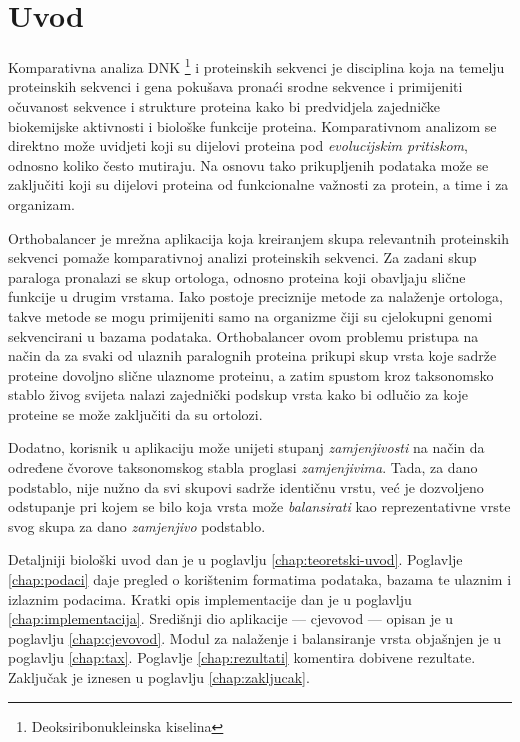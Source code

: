 \chapter{Uvod}
\label{chap:uvod}

Komparativna analiza DNK \footnote{Deoksiribonukleinska kiselina} i proteinskih
sekvenci je disciplina koja na temelju proteinskih sekvenci i gena pokušava
pronaći srodne sekvence i primijeniti očuvanost sekvence i strukture proteina
kako bi predvidjela zajedničke biokemijske aktivnosti i biološke funkcije
proteina. \cite{koonin} Komparativnom analizom se direktno može uvidjeti koji su
dijelovi proteina pod \emph{evolucijskim pritiskom}, odnosno koliko često
mutiraju. Na osnovu tako prikupljenih podataka može se zaključiti koji su
dijelovi proteina od funkcionalne važnosti za protein, a time i za organizam.

Orthobalancer je mrežna aplikacija koja kreiranjem skupa relevantnih proteinskih
sekvenci pomaže komparativnoj analizi proteinskih sekvenci. Za zadani skup
paraloga pronalazi se skup ortologa, odnosno proteina koji obavljaju slične
funkcije u drugim vrstama. Iako postoje preciznije metode za nalaženje ortologa,
takve metode se mogu primijeniti samo na organizme čiji su cjelokupni genomi
sekvencirani u bazama podataka.  Orthobalancer ovom problemu pristupa na način
da za svaki od ulaznih paralognih proteina prikupi skup vrsta koje sadrže
proteine dovoljno slične ulaznome proteinu, a zatim spustom kroz taksonomsko
stablo živog svijeta nalazi zajednički podskup vrsta kako bi odlučio za koje
proteine se može zaključiti da su ortolozi.

Dodatno, korisnik u aplikaciju može unijeti stupanj \emph{zamjenjivosti} na
način da određene čvorove taksonomskog stabla proglasi \emph{zamjenjivima}.
Tada, za dano podstablo, nije nužno da svi skupovi sadrže identičnu vrstu, već
je dozvoljeno odstupanje pri kojem se bilo koja vrsta može \emph{balansirati}
kao reprezentativne vrste svog skupa za dano \emph{zamjenjivo} podstablo.

Detaljniji biološki uvod dan je u poglavlju \ref{chap:teoretski-uvod}. Poglavlje
\ref{chap:podaci} daje pregled o korištenim formatima podataka, bazama te
ulaznim i izlaznim podacima. Kratki opis implementacije dan je u poglavlju
\ref{chap:implementacija}. Središnji dio aplikacije --- cjevovod --- opisan je u
poglavlju \ref{chap:cjevovod}. Modul za nalaženje i balansiranje vrsta objašnjen
je u poglavlju \ref{chap:tax}. Poglavlje \ref{chap:rezultati} komentira dobivene
rezultate. Zaključak je iznesen u poglavlju \ref{chap:zakljucak}.


 
